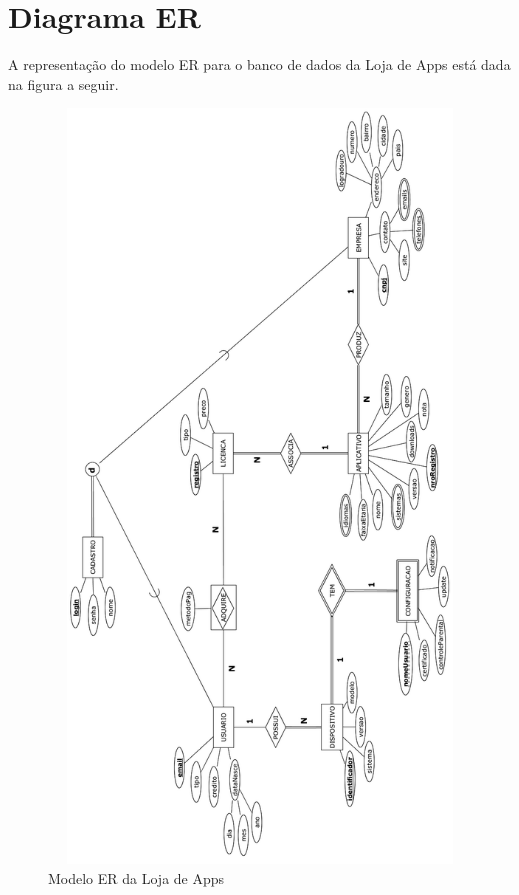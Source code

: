 \section{Diagrama ER}

\vspace{5mm}

A representação do modelo ER para o banco de dados da Loja de Apps está dada na figura a seguir.

\begin{figure}[!htb]
\centering
\includegraphics[height=20cm, width=14cm]{imagem}
\caption{Modelo ER da Loja de Apps}
\label{Rotulo}
\end{figure}